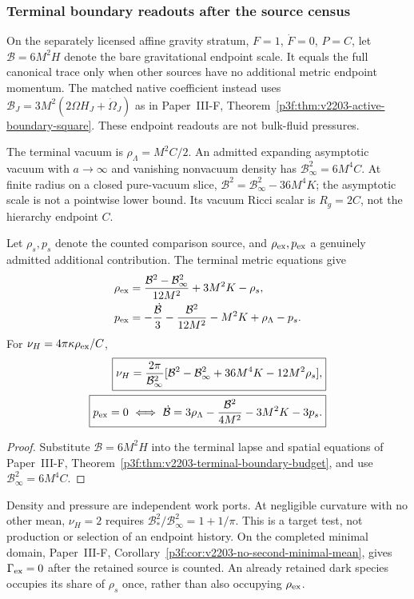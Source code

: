 \documentclass[12pt,a4paper]{article}
\begin{document}
\subsubsection{Terminal boundary readouts after the source census}
On the separately licensed affine gravity stratum, $F=1$, $\dot F=0$,
$P=C$, let $\mathcal B=6M^2H$ denote the bare gravitational endpoint
scale. It equals the full canonical trace only when other sources have
no additional metric endpoint momentum. The matched native coefficient
instead uses $\mathcal B_J=3M^2(2\Omega H_J+\dot\Omega_J)$ as in
Paper~III-F, Theorem~\ref{p3f:thm:v2203-active-boundary-square}.
These endpoint readouts are not bulk-fluid pressures.

The terminal vacuum is $\rho_\Lambda=M^2C/2$.
An admitted expanding asymptotic vacuum with $a\to\infty$ and vanishing
nonvacuum density has $\mathcal B_\infty^2=6M^4C$.
At finite radius on a closed pure-vacuum slice,
$\mathcal B^2=\mathcal B_\infty^2-36M^4K$;
the asymptotic scale is not a pointwise lower bound.
Its vacuum Ricci scalar is $R_g=2C$, not the hierarchy endpoint $C$.

\begin{corollary}
\label{p8:cor:v2203-terminal-boundary-amplitude}
Let $\rho_s,p_s$ denote the counted comparison source, and
$\rho_{\rm ex},p_{\rm ex}$ a genuinely admitted additional contribution.
The terminal metric equations give
\begin{align}
\label{p8:eq:v2203-terminal-subtracted-stress}
 \rho_{\rm ex}
 &=\frac{\mathcal B^2-\mathcal B_\infty^2}{12M^2}
     +3M^2K-\rho_s,\\
 p_{\rm ex}
 &=-\frac{\dot{\mathcal B}}3-\frac{\mathcal B^2}{12M^2}
     -M^2K+\rho_\Lambda-p_s.\nonumber
\end{align}
For $\nu_H=4\pi\kappa\rho_{\rm ex}/C$,
\begin{align}
\label{p8:eq:v2203-terminal-nu-test}
 \boxed{\nu_H=\frac{2\pi}{\mathcal B_\infty^2}
 [\mathcal B^2-\mathcal B_\infty^2+36M^4K-12M^2\rho_s],}\\
 \boxed{p_{\rm ex}=0\ \Longleftrightarrow\
 \dot{\mathcal B}=3\rho_\Lambda-\frac{\mathcal B^2}{4M^2}
                  -3M^2K-3p_s.}\nonumber
\end{align}
\end{corollary}
\begin{proof}
Substitute $\mathcal B=6M^2H$ into the terminal lapse and spatial
equations of Paper~III-F,
Theorem~\ref{p3f:thm:v2203-terminal-boundary-budget},
and use $\mathcal B_\infty^2=6M^4C$.
\end{proof}
Density and pressure are independent work ports.
At negligible curvature with no other mean, $\nu_H=2$ requires
$\mathcal B_*^2/\mathcal B_\infty^2=1+1/\pi$.
This is a target test, not production or selection of an endpoint history.
On the completed minimal domain,
Paper~III-F, Corollary~\ref{p3f:cor:v2203-no-second-minimal-mean},
gives $\Gamma_{\rm ex}=0$ after the retained source is counted.
An already retained dark species occupies its share of $\rho_s$ once,
rather than also occupying $\rho_{\rm ex}$.
\end{document}
